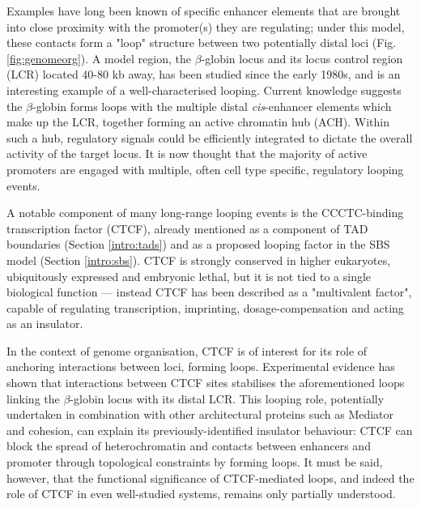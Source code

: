 \documentclass[a4paper,11pt,oneside]{book}
\begin{document}
Examples have long been known of specific enhancer elements that are brought into close proximity with the promoter(s) they are regulating; under this model, these contacts form a "loop" structure between two potentially distal loci\cite{Kadauke2009a, Sexton2009} (Fig. \ref{fig:genomeorg}). A model region, the $\beta$-globin locus and its locus control region (LCR) located 40-80 kb away,\cite{Dekker2013} has been studied since the early 1980s,\cite{Banerji1981, Engel2000, Blackwood1998, Tolhuis2002} and is an interesting example of a well-characterised looping. Current knowledge suggests the $\beta$-globin forms loops with the multiple distal \emph{cis}-enhancer elements which make up the LCR, together forming an active chromatin hub (ACH).\cite{VandeCorput2012a} Within such a hub, regulatory signals could be efficiently integrated to dictate the overall activity of the target locus.\cite{DeWit2012, Pombo2015} It is now thought that the majority of active promoters are engaged with multiple, often cell type specific, regulatory looping events.\cite{Sanyal2012, Jin2013}

A notable component of many long-range looping events is the CCCTC-binding transcription factor (CTCF),\cite{Ong2014, Phillips2009} already mentioned as a component of TAD boundaries (Section \ref{intro:tads}) and as a proposed looping factor in the SBS model (Section \ref{intro:sbs}). CTCF is strongly conserved in higher eukaryotes,\cite{Filippova1996a} ubiquitously expressed and embryonic lethal, but it is not tied to a single biological function --- instead CTCF has been described as a "multivalent factor",\cite{Phillips2009} capable of regulating transcription, imprinting, dosage-compensation and acting as an insulator. 

In the context of genome organisation, CTCF is of interest for its role of anchoring interactions between loci, forming loops. Experimental evidence has shown that interactions between CTCF sites stabilises the aforementioned loops linking the $\beta$-globin locus with its distal LCR.\cite{Splinter2006} This looping role, potentially undertaken in combination with other architectural proteins such as Mediator and cohesion,\cite{Phillips-Cremins2013, Sexton2009} can explain its previously-identified insulator behaviour: CTCF can block the spread of heterochromatin and contacts between enhancers and promoter through topological constraints by forming loops.\cite{Phillips2009} It must be said, however, that the functional significance of CTCF-mediated loops, and indeed the role of CTCF in even well-studied systems, remains only partially understood.\cite{Gomez-Diaz2014}
\end{document}
